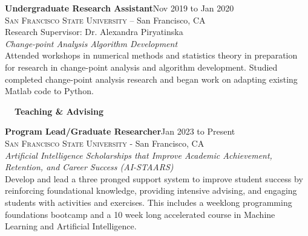 \documentclass[hidelinks, 10.5pt]{article}
\newcommand{\contentwidth}{0.9\linewidth}
\newcommand{\sectionspacing}{8mm}
\newcommand{\sectiontocontentspacing}{4mm}
\begin{document}
{{    \begin{minipage}[ct]{\contentwidth}
        \textbf{Undergraduate Research Assistant}\hfill Nov 2019 to Jan 2020\\
        \textsc{San Francisco State University} -- San Francisco, CA\\
        Research Supervisor: Dr. Alexandra Piryatinska\vspace{1mm}\\
        {\textit{Change-point Analysis Algorithm Development}}\\
        Attended workshops in numerical methods and statistics theory in preparation for research in change-point analysis and algorithm
        development.  Studied completed change-point analysis research and began work on adapting existing Matlab code to Python.
    \end{minipage}
}

\vspace{\sectionspacing}


{\fontsize{14}{14}\selectfont \textbf{\ \ Teaching \& Advising\ \ }}\hrulefill

\vspace{\sectiontocontentspacing}

\begin{minipage}[ct]{\contentwidth}
    \textbf{Program Lead/Graduate Researcher}\hfill Jan 2023 to Present\\
    {\textsc{San Francisco State University} - San Francisco, CA}\\
    \textit{Artificial Intelligence Scholarships that Improve Academic Achievement, Retention, and Career Success (AI-STAARS)}\\
    Develop and lead a three pronged support system to improve student success by reinforcing foundational knowledge, providing intensive
    advising, and engaging students with activities and exercises. This includes a weeklong programming foundations bootcamp and a 10 week
    long accelerated course in Machine Learning and Artificial Intelligence.
\end{minipage}

}
\end{document}
